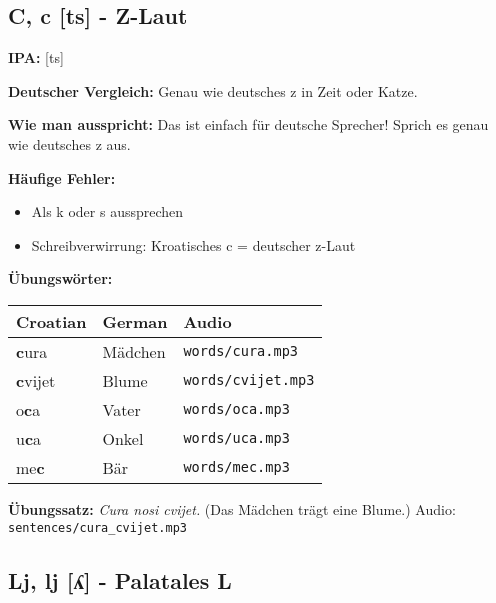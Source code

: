 \subsection{C, c [ts] - \glqq Z-Laut\grqq{}}

\begin{tcolorbox}[colback=lightyellow!30, colframe=orange, title=\textbf{C, c}]

\textbf{IPA:} [ts]

\textbf{Deutscher Vergleich:}
Genau wie deutsches \glqq z\grqq{} in \glqq Zeit\grqq{} oder \glqq Katze\grqq{}.

\textbf{Wie man ausspricht:}
Das ist einfach für deutsche Sprecher! Sprich es genau wie deutsches \glqq z\grqq{} aus.

\textbf{Häufige Fehler:}
\begin{itemize}
    \item Als \glqq k\grqq{} oder \glqq s\grqq{} aussprechen
    \item Schreibverwirrung: Kroatisches \glqq c\grqq{} = deutscher \glqq z\grqq{}-Laut
\end{itemize}

\textbf{Übungswörter:}
\begin{tabular}{lll}
\textbf{Croatian} & \textbf{German} & \textbf{Audio} \\
\midrule
\textbf{c}ura & Mädchen & \texttt{words/cura.mp3} \\
\textbf{c}vijet & Blume & \texttt{words/cvijet.mp3} \\
o\textbf{c}a & Vater & \texttt{words/oca.mp3} \\
u\textbf{c}a & Onkel & \texttt{words/uca.mp3} \\
me\textbf{c} & Bär & \texttt{words/mec.mp3} \\
\end{tabular}

\textbf{Übungssatz:}
\textit{Cura nosi cvijet.}
(Das Mädchen trägt eine Blume.)
Audio: \texttt{sentences/cura\_cvijet.mp3}

\end{tcolorbox}

\subsection{Lj, lj [ʎ] - \glqq Palatales L\grqq{}}

